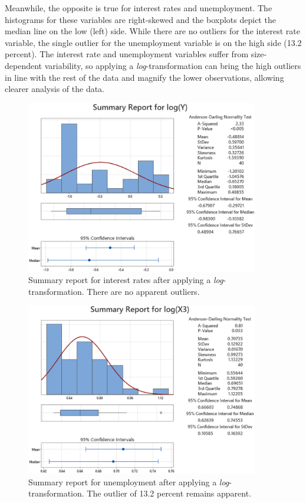 \documentclass[12pt]{article}
\begin{document}
Meanwhile, the opposite is true for interest rates and unemployment. The histograms for these variables are right-skewed and the boxplots depict the median line on the low (left) side. While there are no outliers for the interest rate variable, the single outlier for the unemployment variable is on the high side (13.2 percent). The interest rate and unemployment variables suffer from size-dependent variability, so applying a \emph{log}-transformation can bring the high outliers in line with the rest of the data and magnify the lower observations, allowing clearer analysis of the data. 
\begin{figure}[ht]
\begin{center}
\includegraphics[width=4in]{images/log-interest-rate-summary.png}
\end{center}
\caption{Summary report for interest rates after applying a \emph{log}-transformation. There are no apparent outliers.\label{fig:loginterestratesummary}}
\end{figure}
\begin{figure}[ht]
\begin{center}
\includegraphics[width=4in]{images/log-unemployment-summary.png}
\end{center}
\caption{Summary report for unemployment after applying a \emph{log}-transformation. The outlier of 13.2 percent remains apparent.\label{fig:logunemploymentsummary}}
\end{figure}
\end{document}

